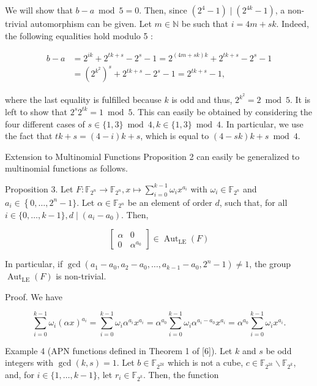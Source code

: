 \documentclass[10pt]{article}
\begin{document}
We will show that $b-a \bmod 5=0$. Then, since $\left(2^{4}-1\right) \mid\left(2^{4 k}-1\right)$, a non-trivial automorphism can be given. Let $m \in \mathbb{N}$ be such that $i=4 m+s k$. Indeed, the following equalities hold modulo 5 :

$$
\begin{aligned}
b-a & =2^{i k}+2^{t k+s}-2^{s}-1=2^{(4 m+s k) k}+2^{t k+s}-2^{s}-1 \\
& =\left(2^{k^{2}}\right)^{s}+2^{t k+s}-2^{s}-1=2^{t k+s}-1,
\end{aligned}
$$

where the last equality is fulfilled because $k$ is odd and thus, $2^{k^{2}}=2 \bmod 5$. It is left to show that $2^{s} 2^{t k}=1 \bmod 5$. This can easily be obtained by considering the four different cases of $s \in\{1,3\} \bmod 4, k \in\{1,3\} \bmod 4$. In particular, we use the fact that $t k+s=(4-i) k+s$, which is equal to $(4-s k) k+s \bmod 4$.

Extension to Multinomial Functions Proposition 2 can easily be generalized to multinomial functions as follows.

Proposition 3. Let $F: \mathbb{F}_{2^{n}} \rightarrow \mathbb{F}_{2^{n}}, x \mapsto \sum_{i=0}^{k-1} \omega_{i} x^{a_{i}}$ with $\omega_{i} \in \mathbb{F}_{2^{n}}$ and $a_{i} \in\left\{0, \ldots, 2^{n}-\right. 1\}$. Let $\alpha \in \mathbb{F}_{2^{n}}$ be an element of order $d$, such that, for all $i \in\{0, \ldots, k-1\}, d \mid\left(a_{i}-a_{0}\right)$. Then,

$$
\left[\begin{array}{cc}
\alpha & 0 \\
0 & \alpha^{a_{0}}
\end{array}\right] \in \operatorname{Aut}_{\mathrm{LE}}(F)
$$

In particular, if $\operatorname{gcd}\left(a_{1}-a_{0}, a_{2}-a_{0}, \ldots, a_{k-1}-a_{0}, 2^{n}-1\right) \neq 1$, the group $\operatorname{Aut}_{\mathrm{LE}}(F)$ is non-trivial.

Proof. We have

$$
\sum_{i=0}^{k-1} \omega_{i}(\alpha x)^{a_{i}}=\sum_{i=0}^{k-1} \omega_{i} \alpha^{a_{i}} x^{a_{i}}=\alpha^{a_{0}} \sum_{i=0}^{k-1} \omega_{i} \alpha^{a_{i}-a_{0}} x^{a_{i}}=\alpha^{a_{0}} \sum_{i=0}^{k-1} \omega_{i} x^{a_{i}} .
$$

Example 4 (APN functions defined in Theorem 1 of [6]). Let $k$ and $s$ be odd integers with $\operatorname{gcd}(k, s)=1$. Let $b \in \mathbb{F}_{2^{2 k}}$ which is not a cube, $c \in \mathbb{F}_{2^{2 k}} \backslash \mathbb{F}_{2^{k}}$, and, for $i \in\{1, \ldots, k-1\}$, let $r_{i} \in \mathbb{F}_{2^{k}}$. Then, the function
\end{document}
